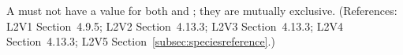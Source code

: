 A \SpeciesReference must not have a value for both 
and ; they are mutually exclusive.  (References:
L2V1 Section~4.9.5; L2V2 Section~4.13.3; L2V3 Section~4.13.3; L2V4 Section~4.13.3; L2V5 Section~\ref{subsec:speciesreference}.)
